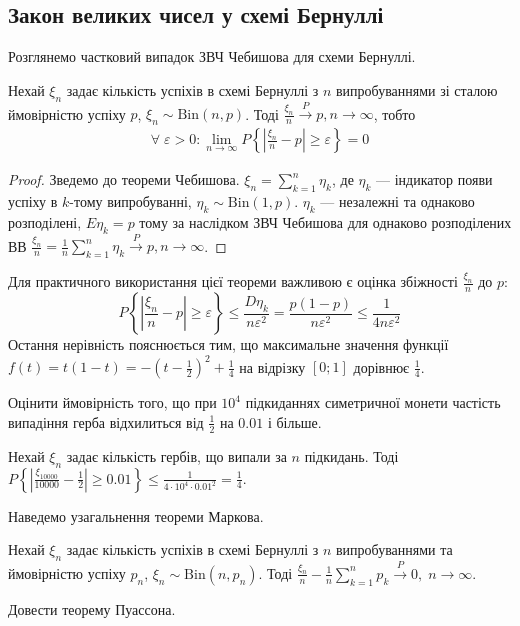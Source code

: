 \subsection{Закон великих чисел у схемі Бернуллі}
Розглянемо частковий випадок ЗВЧ Чебишова для схеми Бернуллі.
\begin{theorem*}
    Нехай $\xi_n$ задає кількість успіхів в схемі Бернуллі з $n$ випробуваннями зі сталою ймовірністю успіху $p$, $\xi_n \sim \mathrm{Bin}(n, p)$. Тоді 
    $\frac{\xi_n}{n}  \overset{P}{\longrightarrow} p, n\to\infty$, тобто
    \begin{gather}
        \forall \; \varepsilon >0 : \lim_{n \rightarrow \infty} P\left\{ \left| \frac{\xi_n}{n} - p\right| \geq \varepsilon\right\} = 0
    \end{gather}
\end{theorem*}
\begin{proof}
    Зведемо до теореми Чебишова. $\xi_n = \sum\limits_{k=1}^n \eta_k$, де $\eta_k$ --- індикатор появи успіху в $k$-тому випробуванні,
    $\eta_k \sim \mathrm{Bin}(1, p)$. $\eta_k$ --- незалежні та однаково розподілені, $E\eta_k = p$ тому за наслідком ЗВЧ Чебишова для однаково
    розподілених ВВ
    $\frac{\xi_n}{n} = \frac{1}{n} \sum\limits_{k=1}^n \eta_k \overset{P}{\longrightarrow} p, n\to\infty$.
\end{proof}
\begin{remark}
    Для практичного використання цієї теореми важливою є оцінка збіжності $\frac{\xi_n}{n}$ до $p$:
    $$P\left\{ \left| \frac{\xi_n}{n} - p\right| \geq \varepsilon\right\} \leq \frac{D\eta_k}{n \varepsilon^2} = \frac{p(1-p)}{n \varepsilon^2} \leq \frac{1}{4n \varepsilon^2}$$
    Остання нерівність пояснюється тим, що максимальне значення функції $f(t) = t(1-t) = -\left(t - \frac{1}{2}\right)^2 + \frac{1}{4}$ на відрізку $[0;1]$ дорівнює $\frac{1}{4}$.
\end{remark}
\begin{example}
    Оцінити ймовірність того, що при $10^4$ підкиданнях симетричної монети частість випадіння герба відхилиться від $\frac{1}{2}$ на $0.01$ і більше.

    Нехай $\xi_n$ задає кількість гербів, що випали за $n$ підкидань. Тоді
    $P\left\{ \left| \frac{\xi_{10000}}{10000} - \frac{1}{2}\right| \geq 0.01\right\} \leq \frac{1}{4\cdot 10^4 \cdot 0.01^2} = \frac{1}{4}$.
\end{example}
Наведемо узагальнення теореми Маркова.
\begin{theorem*}
    Нехай $\xi_n$ задає кількість успіхів в схемі Бернуллі з $n$ випробуваннями та ймовірністю успіху $p_n$, $\xi_n \sim \mathrm{Bin}(n, p_n)$.
    Тоді 
    $\frac{\xi_n}{n} - \frac{1}{n}\sum\limits_{k=1}^n p_k \overset{P}{\longrightarrow} 0, \; n \to \infty$.
\end{theorem*}
\begin{exercise}
    Довести теорему Пуассона.
\end{exercise}

